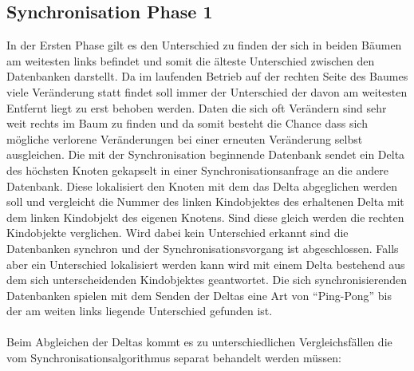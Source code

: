 \documentclass[a4paper,11pt,oneside,%
headsepline,												%
footsepline,												%
bibtotocnumbered									%
]{scrreprt}
\begin{document}
\subsection{Synchronisation Phase 1} 
In der Ersten Phase gilt es den Unterschied zu finden der sich in beiden Bäumen am weitesten links befindet und somit die älteste Unterschied zwischen den Datenbanken darstellt. Da im laufenden Betrieb auf der rechten Seite des Baumes viele Veränderung statt findet soll immer der Unterschied der davon am weitesten Entfernt liegt zu erst behoben werden. Daten die sich oft Verändern sind sehr weit rechts im Baum zu finden und da somit besteht die Chance dass sich mögliche verlorene Veränderungen bei einer erneuten Veränderung selbst ausgleichen.
Die mit der Synchronisation beginnende Datenbank sendet ein Delta des höchsten Knoten gekapselt in einer Synchronisationsanfrage an die andere Datenbank. Diese lokalisiert den Knoten mit dem das Delta abgeglichen werden soll und vergleicht die Nummer des linken Kindobjektes des erhaltenen Delta mit dem linken Kindobjekt des eigenen Knotens. Sind diese gleich werden die rechten Kindobjekte verglichen. Wird dabei kein Unterschied erkannt sind die Datenbanken synchron und der Synchronisationsvorgang ist abgeschlossen. Falls aber ein Unterschied lokalisiert werden kann wird mit einem Delta bestehend aus dem sich unterscheidenden Kindobjektes geantwortet. Die sich synchronisierenden Datenbanken spielen mit dem Senden der Deltas eine Art von \enquote{Ping-Pong} bis der am weiten links liegende Unterschied gefunden ist.\\\\
Beim Abgleichen der Deltas kommt es zu unterschiedlichen Vergleichsfällen die vom Synchronisationsalgorithmus separat behandelt werden müssen:
\end{document}
